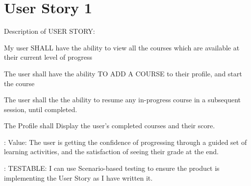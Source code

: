 \section{User Story 1}
\item Description of USER STORY:
\item My user SHALL have the ability to view all the courses which are available at their current level of progress 
\item The user shall have the ability TO ADD A COURSE to their profile, and start the course
\item The user shall the the ability to resume any in-progress course in a subsequent session, until completed.
\item The Profile shall Display the user's completed courses and their score.
\item: Value: The user is getting the confidence of progressing through a guided set of learning activities, and the satisfaction of seeing their grade at the end. 
\item: TESTABLE: I can use Scenario-based testing to ensure the product is implementing the User Story as I have written it.

